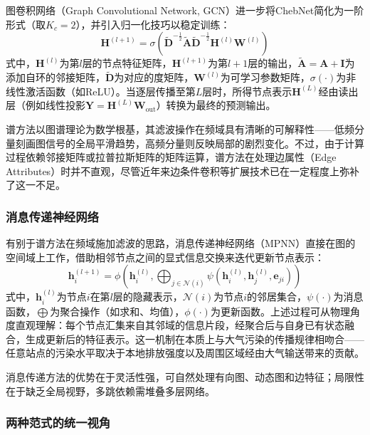 图卷积网络（Graph Convolutional Network, GCN）\citep{kipf2017semi}进一步将ChebNet简化为一阶形式（取$K_c=2$），并引入归一化技巧以稳定训练：
\begin{equation}
\mathbf{H}^{(l+1)} = \sigma\left(\tilde{\mathbf{D}}^{-\frac{1}{2}} \tilde{\mathbf{A}} \tilde{\mathbf{D}}^{-\frac{1}{2}} \mathbf{H}^{(l)} \mathbf{W}^{(l)}\right)
\label{eq:gcn}
\end{equation}
\noindent 式中，$\mathbf{H}^{(l)}$为第$l$层的节点特征矩阵，$\mathbf{H}^{(l+1)}$为第$l+1$层的输出，$\tilde{\mathbf{A}} = \mathbf{A} + \mathbf{I}$为添加自环的邻接矩阵，$\tilde{\mathbf{D}}$为对应的度矩阵，$\mathbf{W}^{(l)}$为可学习参数矩阵，$\sigma(\cdot)$为非线性激活函数（如ReLU）。当逐层传播至第$L$层时，所得节点表示$\mathbf{H}^{(L)}$经由读出层（例如线性投影$\mathbf{Y} = \mathbf{H}^{(L)}\mathbf{W}_{\text{out}}$）转换为最终的预测输出。

谱方法以图谱理论为数学根基，其滤波操作在频域具有清晰的可解释性——低频分量刻画图信号的全局平滑趋势，高频分量则反映局部的剧烈变化。不过，由于计算过程依赖邻接矩阵或拉普拉斯矩阵的矩阵运算，谱方法在处理边属性（Edge Attributes）时并不直观，尽管近年来边条件卷积等扩展技术已在一定程度上弥补了这一不足。

\subsubsection{消息传递神经网络}

有别于谱方法在频域施加滤波的思路，消息传递神经网络（MPNN）\citep{gilmer2017neural}直接在图的空间域上工作，借助相邻节点之间的显式信息交换来迭代更新节点表示：
\begin{equation}
\mathbf{h}_i^{(l+1)} = \phi\left(\mathbf{h}_i^{(l)}, \bigoplus_{j \in \mathcal{N}(i)} \psi\left(\mathbf{h}_i^{(l)}, \mathbf{h}_j^{(l)}, \mathbf{e}_{ji}\right)\right)
\label{eq:message_passing}
\end{equation}
\noindent 式中，$\mathbf{h}_i^{(l)}$为节点$i$在第$l$层的隐藏表示，$\mathcal{N}(i)$为节点$i$的邻居集合，$\psi(\cdot)$为消息函数，$\bigoplus$为聚合操作（如求和、均值），$\phi(\cdot)$为更新函数。上述过程可从物理角度直观理解：每个节点汇集来自其邻域的信息片段，经聚合后与自身已有状态融合，生成更新后的特征表示。这一机制在本质上与大气污染的传播规律相吻合——任意站点的污染水平取决于本地排放强度以及周围区域经由大气输送带来的贡献。

消息传递方法的优势在于灵活性强，可自然处理有向图、动态图和边特征；局限性在于缺乏全局视野，多跳依赖需堆叠多层网络。

\subsubsection{两种范式的统一视角}

